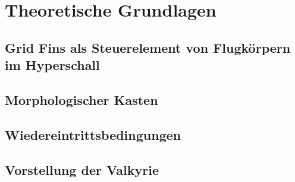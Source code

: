 \chapter{Theoretische Grundlagen}
\label{sec:grundlagen}

\section{Grid Fins als Steuerelement von Flugkörpern im Hyperschall}



\section{Morphologischer Kasten}

\section{Wiedereintrittsbedingungen}

\section{Vorstellung der Valkyrie}

